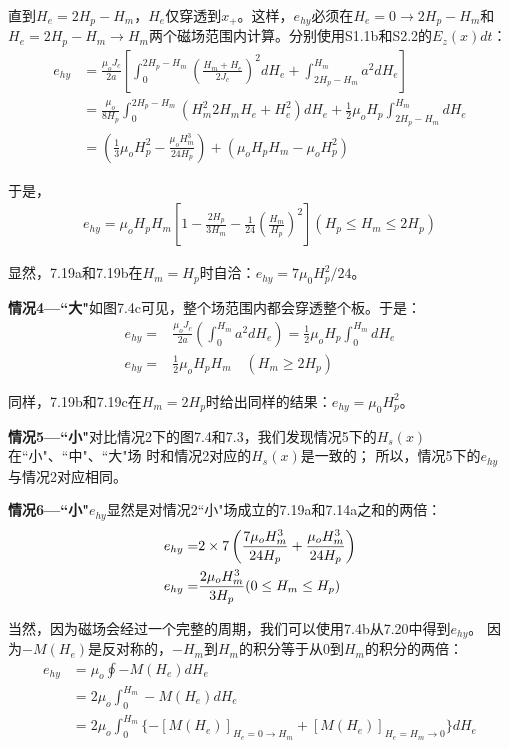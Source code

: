 直到$H_e=2H_p-H_m$，$H_e$仅穿透到$x_+$。这样，$e_{hy}$必须在$H_e=0\rightarrow 2H_p-H_m$和
$H_e=2H_p-H_m\rightarrow H_m$两个磁场范围内计算。分别使用S1.1b和S2.2的$E_z(x)dt$：
\begin{align*}%
e_{hy}&=\frac{\mu_oJ_c}{2a}\left[\int_{0}^{2H_p-H_m}\left(\frac{H_m+H_e}{2J_c}\right)^2dH_e+\int_{2H_p-H_m}^{H_m}a^2dH_e\right] \\
&=\frac{\mu_o}{8H_p}\int_{0}^{2H_p-H_m}(H_{m}^{2}2H_mH_e+H_{e}^{2})dH_e+\frac{1}{2}\mu_oH_p\int_{2H_p-H_m}^{H_m}dH_e \\
&=\left(\frac{1}{3}\mu_oH_{p}^{2}-\frac{\mu_oH_{m}^{3}}{24H_p}\right)+(\mu_oH_pH_m-\mu_oH_{p}^{2}) 
\end{align*}

于是，
\begin{align*}
e_{hy}=\mu_oH_pH_m\left[1-\frac{2H_p}{3H_m}-\frac{1}{24}\left(\frac{H_m}{H_p}\right)^2\right]      (H_p\leq H_m\leq 2H_p)
\end{align*}

显然，7.19a和7.19b在$H_m=H_p$时自洽：$e_{hy}=7\mu_0 H_p^2/24$。

\textbf{情况4---``大"}\quad 如图7.4c可见，整个场范围内都会穿透整个板。于是：
\begin{align*}%
e_{hy}=&\frac{\mu_oJ_c}{2a}\left(\int_{0}^{H_m}a^2dH_e\right)=\frac{1}{2}\mu_oH_p\int_{0}^{H_m}dH_e\\
e_{hy}=&\frac{1}{2}\mu_oH_pH_m \quad (H_m\geq 2H_p) \tag{7.19c}
\end{align*}

同样，7.19b和7.19c在$H_m=2H_p$时给出同样的结果：$e_{hy}=\mu_0 H_p^2$。

\textbf{情况5---``小"}\quad 对比情况2下的图7.4和7.3，我们发现情况5下的$H_s(x)$在``小"、``中"、``大"场
时和情况2对应的$H_s(x)$是一致的；
所以，情况5下的$e_{hy}$与情况2对应相同。

\textbf{情况6---``小"}\quad $e_{hy}$显然是对情况2``小"场成立的7.19a和7.14a之和的两倍：
\begin{align}%
e_{hy}=&2\times7\left(\frac{7\mu_oH_{m}^{3}}{24H_p}+\frac{\mu_oH_{m}^{3}}{24H_p}\right)\\\notag
e_{hy}=&\frac{2\mu_oH_{m}^{3}}{3H_p}     (0\leq H_m\leq H_p)
\end{align}

当然，因为磁场会经过一个完整的周期，我们可以使用7.4b从7.20中得到$e_{hy}$。
因为$-M(H_e)$是反对称的，$-H_m$到$H_m$的积分等于从0到$H_m$的积分的两倍：
\begin{align*}%
e_{hy}&=\mu_o\oint-M(H_e)dH_e \\
&=2\mu_o\int_{0}^{H_m}-M(H_e)dH_e\\ 
&=2\mu_o\int_{0}^{H_m}\{-[M(H_e)]_{H_e=0\rightarrow H_m}+[M(H_e)]_{H_e=H_m\rightarrow 0}\}dH_e \tag{7.21}
\end{align*}


